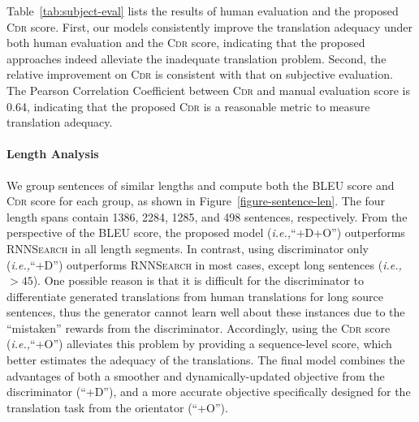 \documentclass[letterpaper]{article} \usepackage{aaai19}  \usepackage{times}  \usepackage{helvet}  \usepackage{courier}  \usepackage{url}  \usepackage{graphicx}  \frenchspacing  \setlength{\pdfpagewidth}{8.5in}  \setlength{\pdfpageheight}{11in}  \usepackage{amsmath}
\begin{document}
Table~\ref{tab:subject-eval} lists the results of human evaluation and the proposed \textsc{Cdr} score. First, our models consistently improve the translation adequacy under both human evaluation and the \textsc{Cdr} score, indicating that the proposed approaches indeed alleviate the inadequate translation problem. Second, the relative improvement on \textsc{Cdr} is consistent with that on subjective evaluation. The Pearson Correlation Coefficient between \textsc{Cdr} and manual evaluation score is 0.64, indicating that the proposed \textsc{Cdr} is a reasonable metric to measure translation adequacy.





\paragraph{Length Analysis}

We group sentences of similar lengths and compute both the BLEU score and \textsc{Cdr} score for each group, as shown in Figure~\ref{figure-sentence-len}. 
The four length spans contain 1386, 2284, 1285, and 498 sentences, respectively.
From the perspective of the BLEU score, the proposed model (\emph{i.e.,}\xspace ``+D+O'') outperforms \textsc{RNNSearch} in all length segments. 
In contrast, using discriminator only (\emph{i.e.,}\xspace ``+D'') outperforms \textsc{RNNSearch} in most cases, except long sentences (\emph{i.e.,}\xspace $>45$). One possible reason is that it is difficult for the discriminator to differentiate generated translations from human translations for long source sentences, thus the generator cannot learn well about these instances due to the ``mistaken'' rewards from the discriminator. 
Accordingly, using the \textsc{Cdr} score (\emph{i.e.,}\xspace ``+O'') alleviates this problem by providing a sequence-level score, which better estimates the adequacy of the translations.
The final model combines the advantages of both a smoother and dynamically-updated objective from the discriminator (``+D''), and a more accurate objective specifically designed for the translation task from the orientator (``+O''). 

\iffalse
\begin{figure}[t]
\centering
    \subfloat[BLEU Score]{\texttt{[image: figures/len-bleu.pdf]}} \\
    \subfloat[\textsc{Cdr} Score]{\texttt{[image: figures/len-cdr.pdf]}}
    \caption{BLEU and \textsc{Cdr} scores of the translations with respect to the input lengths. }\label{figure-sentence-len}
\end{figure}
\fi
\end{document}
